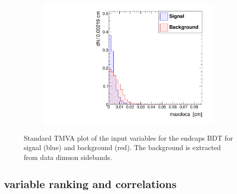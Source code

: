 \documentclass[10pt,a4paper]{article}
\begin{document}
\begin{figure}
\begin{subfigure}[b]{0.2\textwidth}
                \includegraphics[width=\textwidth]{Figures/maxdoca_endcaps}
                \label{fig:maxdocaEndcaps}
        \end{subfigure}
        \caption{Standard TMVA plot of the input variables for the endcaps BDT for signal (blue) and background (red). The background is extracted from data dimuon sidebands.}
        \label{fig:TMVAPlotsEndcaps}
\end{figure}


\subsection{variable ranking and correlations}
\end{document}
